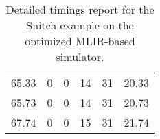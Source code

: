 \begin{table}[h]
{\begin{tabular}{cccccc}
            65.33              & 0                          & 0                          & 14                         & 31                         & 20.33                  \\
            65.73              & 0                          & 0                          & 14                         & 31                         & 20.73                  \\
            67.74              & 0                          & 0                          & 15                         & 31                         & 21.74                  \\
            \bottomrule
        \end{tabular}
    }
    \caption{Detailed timings report for the Snitch example on the optimized MLIR-based simulator.}
\end{table}

